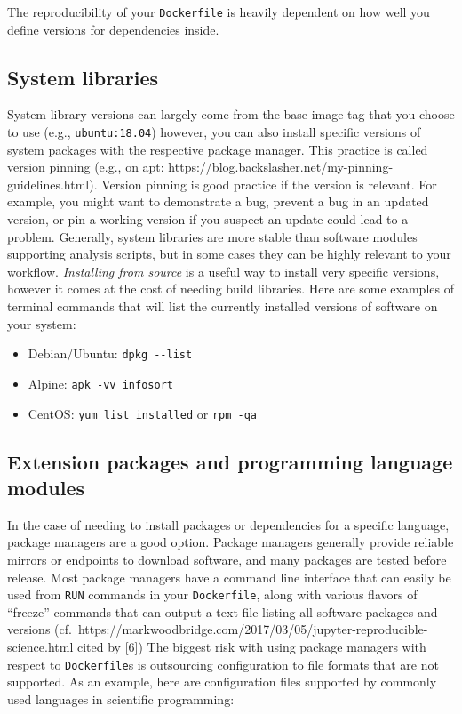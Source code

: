 \documentclass[10pt,letterpaper]{article}
\providecommand{\tightlist}{%
  \setlength{\itemsep}{0pt}\setlength{\parskip}{0pt}}
\begin{document}
The reproducibility of your \texttt{Dockerfile} is heavily dependent on
how well you define versions for dependencies inside.

\hypertarget{system-libraries}{%
\subsection{System libraries}\label{system-libraries}}

System library versions can largely come from the base image tag that
you choose to use (e.g., \texttt{ubuntu:18.04}) however, you can also
install specific versions of system packages with the respective package
manager. This practice is called version pinning (e.g., on apt:
https://blog.backslasher.net/my-pinning-guidelines.html). Version
pinning is good practice if the version is relevant. For example, you
might want to demonstrate a bug, prevent a bug in an updated version, or
pin a working version if you suspect an update could lead to a problem.
Generally, system libraries are more stable than software modules
supporting analysis scripts, but in some cases they can be highly
relevant to your workflow. \emph{Installing from source} is a useful way
to install very specific versions, however it comes at the cost of
needing build libraries. Here are some examples of terminal commands
that will list the currently installed versions of software on your
system:

\begin{itemize}
\tightlist
\item
  Debian/Ubuntu: \texttt{dpkg\ -\/-list}
\item
  Alpine: \texttt{apk\ -vv\ info\textbar{}sort}
\item
  CentOS: \texttt{yum\ list\ installed} or \texttt{rpm\ -qa}
\end{itemize}

\hypertarget{extension-packages-and-programming-language-modules}{%
\subsection{Extension packages and programming language
modules}\label{extension-packages-and-programming-language-modules}}

In the case of needing to install packages or dependencies for a
specific language, package managers are a good option. Package managers
generally provide reliable mirrors or endpoints to download software,
and many packages are tested before release. Most package managers have
a command line interface that can easily be used from \texttt{RUN}
commands in your \texttt{Dockerfile}, along with various flavors of
``freeze'' commands that can output a text file listing all software
packages and versions
(cf.~https://markwoodbridge.com/2017/03/05/jupyter-reproducible-science.html
cited by {[}6{]}) The biggest risk with using package managers with
respect to \texttt{Dockerfile}s is outsourcing configuration to file
formats that are not supported. As an example, here are configuration
files supported by commonly used languages in scientific programming:
\end{document}
